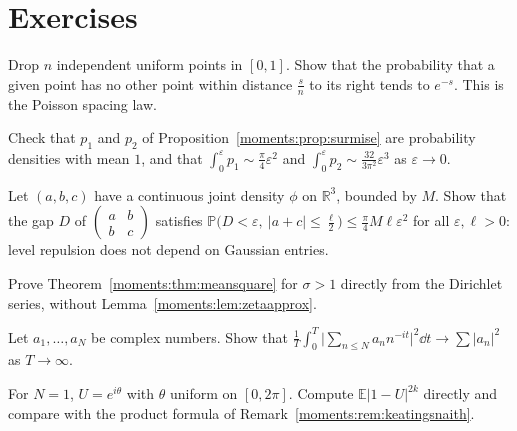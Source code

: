 \section{Exercises}



\begin{exercise}[$\star$]\label{moments:ex:poissonsp}
Drop $n$ independent uniform points in $[0,1]$. Show that the probability that a given point has no other point within distance $\frac sn$ to its right
tends to $e^{-s}$. This is the Poisson spacing law.
\end{exercise}

\begin{exercise}[$\star$]\label{moments:ex:surmisemean}
Check that $p_1$ and $p_2$ of Proposition~\ref{moments:prop:surmise} are probability densities with mean $1$, and that $\int_0^\varepsilon p_1\sim\frac\pi4\varepsilon^2$ and
$\int_0^\varepsilon p_2\sim\frac{32}{3\pi^2}\varepsilon^3$ as $\varepsilon\to0$.
\end{exercise}

\begin{exercise}[$\star\star$]\label{moments:ex:repulsion}
Let $(a,b,c)$ have a continuous joint density $\phi$ on $\mathbb R^3$, bounded by $M$. Show that the gap $D$ of $\begin{pmatrix}a&b\\b&c\end{pmatrix}$
satisfies $\mathbb P\bigl(D<\varepsilon,\ |a+c|\le\frac\ell2\bigr)\le\frac\pi4M\ell\varepsilon^2$ for all $\varepsilon,\ell>0$: level repulsion does not depend
on Gaussian entries.
\end{exercise}

\begin{exercise}[$\star$]\label{moments:ex:sigmagt1}
Prove Theorem~\ref{moments:thm:meansquare} for $\sigma>1$ directly from the Dirichlet series, without Lemma~\ref{moments:lem:zetaapprox}.
\end{exercise}

\begin{exercise}[$\star$]\label{moments:ex:fixedN}
Let $a_1,\dots,a_N$ be complex numbers. Show that $\frac1T\int_0^T\bigl|\sum_{n\le N}a_nn^{-it}\bigr|^2\dd t\to\sum|a_n|^2$ as $T\to\infty$.
\end{exercise}

\begin{exercise}[$\star\star$]\label{moments:ex:cue1}
For $N=1$, $U=e^{i\theta}$ with $\theta$ uniform on $[0,2\pi]$. Compute $\mathbb E|1-U|^{2k}$ directly and compare with the product formula of
Remark~\ref{moments:rem:keatingsnaith}.
\end{exercise}

